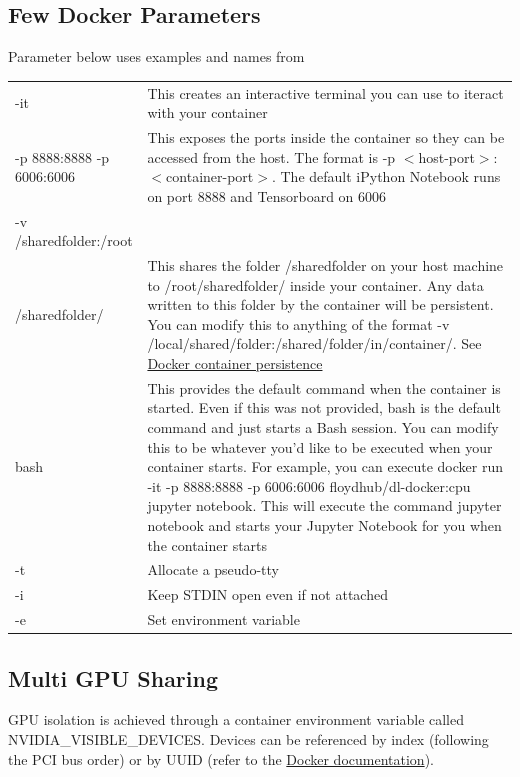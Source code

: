 \documentclass[a4paper]{article}
\begin{document}
\subsection{Few Docker Parameters}
Parameter below uses examples and names from \cite{floydhub}  \\
\begin{tabular} { >{\ttfamily}p{3cm}  p{8.5cm} }

-it	& 		This creates an interactive terminal you can use to iteract with your container \\
-p 8888:8888 -p 6006:6006	& 		This exposes the ports inside the container so they can be accessed from the host. The format is -p $<$host-port$>$:$<$container-port$>$. The default iPython Notebook runs on port 8888 and Tensorboard on 6006 \\
-v /sharedfolder:/root\\/sharedfolder/ &			This shares the folder /sharedfolder on your host machine to /root/sharedfolder/ inside your container. Any data written to this folder by the container will be persistent. You can modify this to anything of the format -v /local/shared/folder:/shared/folder/in/container/. See \href{https://github.com/floydhub/dl-docker#docker-container-persistence}{Docker container persistence} \\
bash	& 		This provides the default command when the container is started. Even if this was not provided, bash is the default command and just starts a Bash session. You can modify this to be whatever you'd like to be executed when your container starts. For example, you can execute docker run -it -p 8888:8888 -p 6006:6006 floydhub/dl-docker:cpu jupyter notebook. This will execute the command jupyter notebook and starts your Jupyter Notebook for you when the container starts \\

-t              & Allocate a pseudo-tty \\
-i              & Keep STDIN open even if not attached \\
-e             & Set environment variable \\
\end{tabular}


\subsection{Multi GPU Sharing}
GPU isolation is achieved through a container environment variable called \\ NVIDIA\_VISIBLE\_DEVICES. Devices can be referenced by index (following the PCI bus order) or by UUID (refer to the \href{https://github.com/nvidia/nvidia-container-runtime#nvidia_visible_devices}{Docker documentation}).
\end{document}
